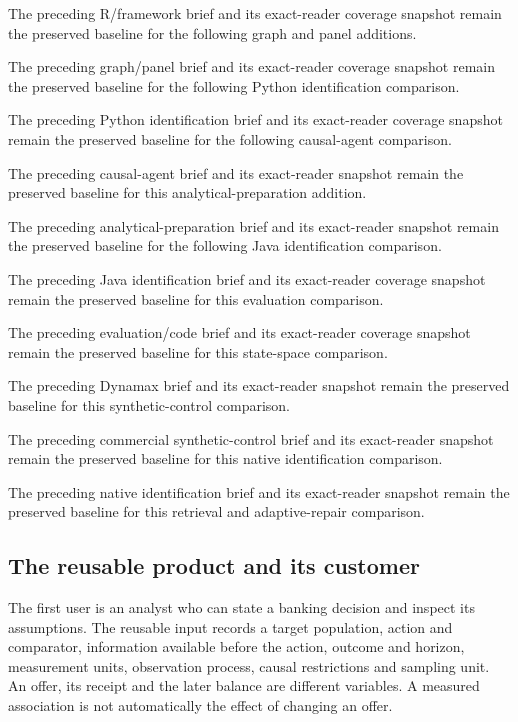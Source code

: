 The preceding R/framework brief and its exact-reader coverage snapshot
remain the preserved baseline for the following graph and panel
additions. \citep{sp18f_reader,sp18f_progress}

The preceding graph/panel brief and its exact-reader coverage snapshot
remain the preserved baseline for the following Python identification
comparison. \citep{sp18gp_reader,sp18gp_progress}

The preceding Python identification brief and its exact-reader coverage
snapshot remain the preserved baseline for the following causal-agent
comparison. \citep{sp18pi_reader,sp18pi_progress}

The preceding causal-agent brief and its exact-reader snapshot remain
the preserved baseline for this analytical-preparation addition.
\citep{sp18ar_reader,sp18ar_progress}

The preceding analytical-preparation brief and its exact-reader snapshot
remain the preserved baseline for the following Java identification
comparison. \citep{sp19dd_reader,sp19dd_progress}

The preceding Java identification brief and its exact-reader coverage
snapshot remain the preserved baseline for this evaluation comparison.
\citep{sp19ji_reader,sp19ji_progress}

The preceding evaluation/code brief and its exact-reader coverage
snapshot remain the preserved baseline for this state-space comparison.
\citep{sp19ec_reader,sp19ec_progress}

The preceding Dynamax brief and its exact-reader snapshot remain the
preserved baseline for this synthetic-control comparison.
\citep{sp19dx_reader,sp19dx_progress}

The preceding commercial synthetic-control brief and its exact-reader
snapshot remain the preserved baseline for this native identification
comparison. \citep{sp19sc_reader,sp19sc_progress}

The preceding native identification brief and its exact-reader snapshot
remain the preserved baseline for this retrieval and adaptive-repair
comparison. \citep{sp19ci_reader,sp19ci_progress}

\hypertarget{the-reusable-product-and-its-customer}{%
\subsection{The reusable product and its
customer}\label{the-reusable-product-and-its-customer}}

The first user is an analyst who can state a banking decision and
inspect its assumptions. The reusable input records a target population,
action and comparator, information available before the action, outcome
and horizon, measurement units, observation process, causal restrictions
and sampling unit. An offer, its receipt and the later balance are
different variables. A measured association is not automatically the
effect of changing an offer.


